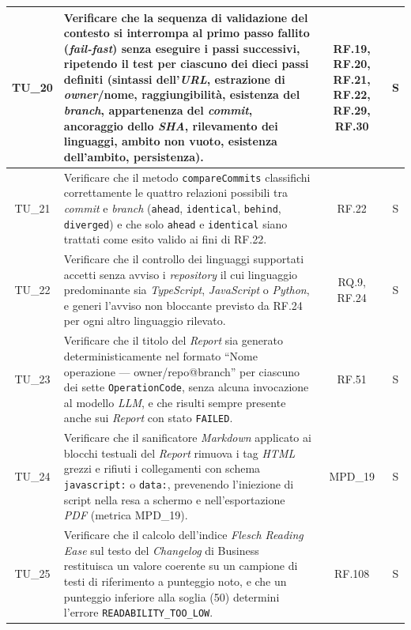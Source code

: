\documentclass[12pt, a4paper]{article}
\newlength{\LargColVal} %
\begin{document}
\begin{xltabular}{\textwidth}{|c|X|C{\LargColVal}|C{\LargColVal}|}
    TU\_20 & Verificare che la sequenza di validazione del contesto si interrompa al primo passo fallito (\textit{fail-fast}) senza eseguire i passi successivi, ripetendo il test per ciascuno dei dieci passi definiti (sintassi dell'\textit{URL}, estrazione di \textit{owner}/nome, raggiungibilità, esistenza del \textit{branch}, appartenenza del \textit{commit}, ancoraggio dello \textit{SHA}, rilevamento dei linguaggi, ambito non vuoto, esistenza dell'ambito, persistenza). & RF.19, RF.20, RF.21, RF.22, RF.29, RF.30 & S \\ \hline

    TU\_21 & Verificare che il metodo \texttt{compareCommits} classifichi correttamente le quattro relazioni possibili tra \textit{commit} e \textit{branch} (\texttt{ahead}, \texttt{identical}, \texttt{behind}, \texttt{diverged}) e che solo \texttt{ahead} e \texttt{identical} siano trattati come esito valido ai fini di RF.22. & RF.22 & S \\ \hline

    TU\_22 & Verificare che il controllo dei linguaggi supportati accetti senza avviso i \textit{repository} il cui linguaggio predominante sia \textit{TypeScript}, \textit{JavaScript} o \textit{Python}, e generi l'avviso non bloccante previsto da RF.24 per ogni altro linguaggio rilevato. & RQ.9, RF.24 & S \\ \hline

    TU\_23 & Verificare che il titolo del \textit{Report} sia generato deterministicamente nel formato ``Nome operazione --- owner/repo@branch'' per ciascuno dei sette \texttt{OperationCode}, senza alcuna invocazione al modello \textit{LLM}, e che risulti sempre presente anche sui \textit{Report} con stato \texttt{FAILED}. & RF.51 & S \\ \hline

    TU\_24 & Verificare che il sanificatore \textit{Markdown} applicato ai blocchi testuali del \textit{Report} rimuova i tag \textit{HTML} grezzi e rifiuti i collegamenti con schema \texttt{javascript:} o \texttt{data:}, prevenendo l'iniezione di script nella resa a schermo e nell'esportazione \textit{PDF} (metrica MPD\_19). & MPD\_19 & S \\ \hline

    TU\_25 & Verificare che il calcolo dell'indice \textit{Flesch Reading Ease} sul testo del \textit{Changelog} di Business restituisca un valore coerente su un campione di testi di riferimento a punteggio noto, e che un punteggio inferiore alla soglia (50) determini l'errore \texttt{READABILITY\_TOO\_LOW}. & RF.108 & S \\ \hline


\end{xltabular}
\end{document}
